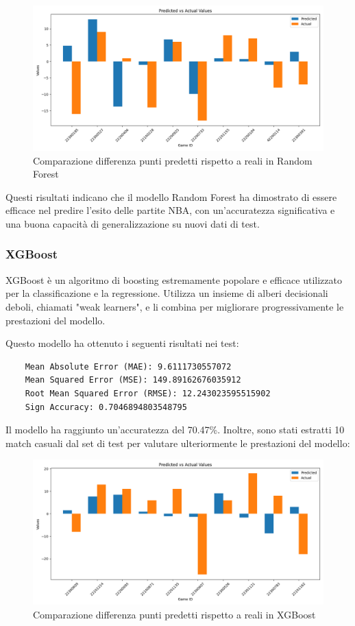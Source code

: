 \begin{figure}[H]
    \centering
    \includegraphics[width=0.7\linewidth]{img/random_forest_istogramma.png}
    \caption{Comparazione differenza punti predetti rispetto a reali in Random Forest}
    \label{fig:enter-label}
\end{figure}

Questi risultati indicano che il modello Random Forest ha dimostrato di essere efficace nel predire l'esito delle partite NBA, con un'accuratezza significativa e una buona capacità di generalizzazione su nuovi dati di test.

\subsubsection{XGBoost}

XGBoost è un algoritmo di boosting estremamente popolare e efficace utilizzato per la classificazione e la regressione. Utilizza un insieme di alberi decisionali deboli, chiamati "weak learners", e li combina per migliorare progressivamente le prestazioni del modello.

Questo modello ha ottenuto i seguenti risultati nei test:

\begin{lstlisting}
    Mean Absolute Error (MAE): 9.6111730557072
    Mean Squared Error (MSE): 149.89162676035912
    Root Mean Squared Error (RMSE): 12.243023595515902
    Sign Accuracy: 0.7046894803548795
\end{lstlisting}

Il modello ha raggiunto un'accuratezza del 70.47\%. Inoltre, sono stati estratti 10 match casuali dal set di test per valutare ulteriormente le prestazioni del modello:

\begin{figure}[H]
    \centering
    \includegraphics[width=0.7\linewidth]{img/xgboost_istogramma.png}
    \caption{Comparazione differenza punti predetti rispetto a reali in XGBoost}
    \label{fig:enter-label}
\end{figure}

